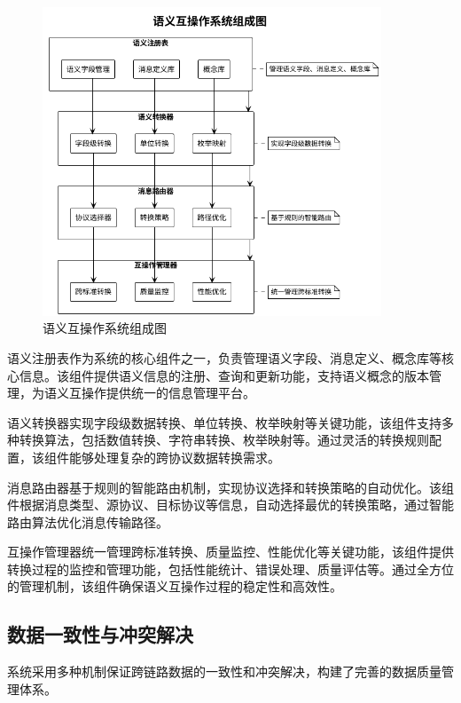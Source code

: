 \begin{figure}[H]
    \centering
    \includegraphics[width=0.9\textwidth]{chapters/fig-0/semantic_interop_system_simple.png}
    \caption{语义互操作系统组成图}
    \label{fig:semantic_interop_system}
\end{figure}

语义注册表作为系统的核心组件之一，负责管理语义字段、消息定义、概念库等核心信息。该组件提供语义信息的注册、查询和更新功能，支持语义概念的版本管理，为语义互操作提供统一的信息管理平台。

语义转换器实现字段级数据转换、单位转换、枚举映射等关键功能，该组件支持多种转换算法，包括数值转换、字符串转换、枚举映射等。通过灵活的转换规则配置，该组件能够处理复杂的跨协议数据转换需求。

消息路由器基于规则的智能路由机制，实现协议选择和转换策略的自动优化。该组件根据消息类型、源协议、目标协议等信息，自动选择最优的转换策略，通过智能路由算法优化消息传输路径。

互操作管理器统一管理跨标准转换、质量监控、性能优化等关键功能，该组件提供转换过程的监控和管理功能，包括性能统计、错误处理、质量评估等。通过全方位的管理机制，该组件确保语义互操作过程的稳定性和高效性。

\subsection{数据一致性与冲突解决}

系统采用多种机制保证跨链路数据的一致性和冲突解决，构建了完善的数据质量管理体系。

